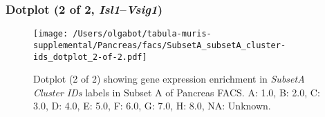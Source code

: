 \clearpage

\subsubsection{Dotplot (2 of 2, \emph{Isl1}--\emph{Vsig1})}
\begin{figure}[h]
\centering
\texttt{[image: /Users/olgabot/tabula-muris-supplemental/Pancreas/facs/SubsetA\_subsetA\_cluster-ids\_dotplot\_2-of-2.pdf]}

\caption{ Dotplot (2 of 2)  showing gene expression enrichment in \emph{SubsetA Cluster IDs} labels in Subset A of Pancreas FACS. A: 1.0, B: 2.0, C: 3.0, D: 4.0, E: 5.0, F: 6.0, G: 7.0, H: 8.0, NA: Unknown.}
\end{figure}

